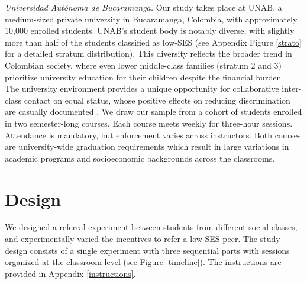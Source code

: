 \documentclass[11pt,a4paper,oneside]{article}
\begin{document}
\textit{Universidad Autónoma de Bucaramanga.}  Our study takes place at UNAB, a medium-sized private university in Bucaramanga, Colombia, with approximately 10,000 enrolled students. UNAB's student body is notably diverse, with slightly more than half of the students classified as low-SES (see Appendix Figure \ref{strato} for a detailed stratum distribution). This diversity reflects the broader trend in Colombian society, where even lower middle-class families (stratum 2 and 3) prioritize university education for their children despite the financial burden \citep[p. 103]{hudson_colombia_2010}. The university environment provides a unique opportunity for collaborative inter-class contact on equal status, whose positive effects on reducing discrimination are casually documented \citep{rao2019familiarity, mousa2020building,lowe2021types}. We draw our sample from a cohort of students enrolled in two semester-long courses. Each course meets weekly for three-hour sessions. Attendance is mandatory, but enforcement varies across instructors. Both courses are university-wide graduation requirements which result in large variations in academic programs and socioeconomic backgrounds across the classrooms.



\section{Design}
We designed a referral experiment between students from different social classes, and experimentally varied the incentives to refer a low-SES peer. The study design consists of a single experiment with three sequential parts with sessions organized at the classroom level (see Figure \ref{timeline}). The instructions are provided in Appendix \ref{instructions}. 
\end{document}
